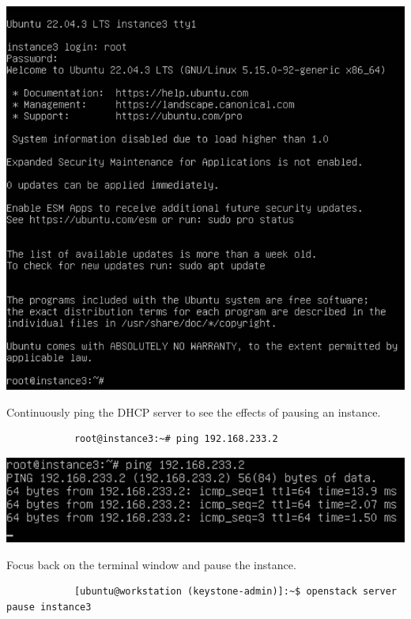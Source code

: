 \documentclass[letterpaper, 12pt]{article}
\begin{document}
\begin{enumerate}
\begin{labstep}
        \begin{center}
            \includegraphics[width=\linewidth]{images/part4/step3.png}
        \end{center}
    \end{labstep}

    \begin{labstep}
        Continuously ping the DHCP server to see the effects of pausing an instance.
        \begin{lstlisting}
            root@instance3:~# ping 192.168.233.2
        \end{lstlisting}

        \begin{center}
            \includegraphics[width=\linewidth]{images/part4/step4.png}
        \end{center}
    \end{labstep}

    \begin{labstep}
        Focus back on the terminal window and pause the instance.
        \begin{lstlisting}
            [ubuntu@workstation (keystone-admin)]:~$ openstack server pause instance3
        \end{lstlisting}


\end{labstep}
\end{enumerate}
\end{document}
